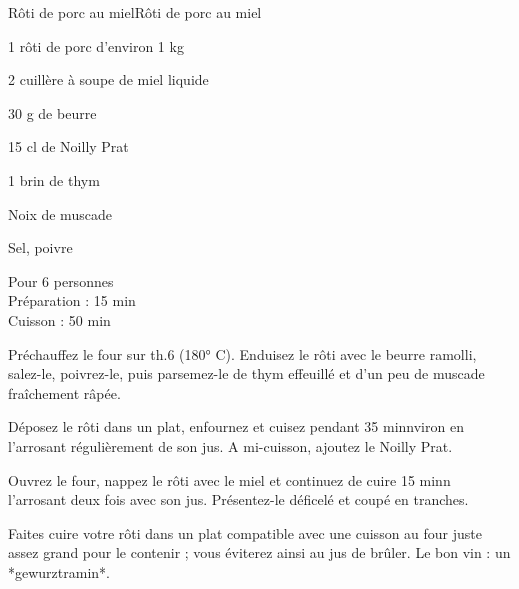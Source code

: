 \begin{recette}{Rôti de porc au miel}{Rôti de porc au miel}

\begin{ingredients}
1 rôti de porc d’environ 1 kg\par
2 cuillère à soupe de miel liquide\par
	30 g de beurre\par
	15 cl de Noilly Prat\par
1 brin de thym\par
Noix de muscade\par
Sel, poivre\par
\end{ingredients}

\begin{infos}
Pour 6 personnes\\
Préparation : 15 min\\
Cuisson : 50 min\\
\end{infos}

\begin{etapes}
\item Préchauffez le four sur th.6 (180° C). Enduisez le rôti avec le beurre ramolli, salez-le, poivrez-le, puis parsemez-le de thym effeuillé et d’un peu de muscade fraîchement  râpée.
\item Déposez le rôti dans un plat, enfournez et cuisez pendant 35 minnviron en l’arrosant régulièrement de son jus. A mi-cuisson, ajoutez le Noilly Prat.
\item Ouvrez le four, nappez le rôti avec le miel et continuez de cuire 15 minn l’arrosant deux fois avec son jus. Présentez-le déficelé et coupé en tranches.
\end{etapes}

\begin{conseils}
Faites cuire votre rôti dans un plat compatible avec une cuisson au four juste assez grand pour le contenir ; vous éviterez ainsi au jus de brûler.
Le bon vin : un *gewurztramin*.
\end{conseils}

\end{recette}